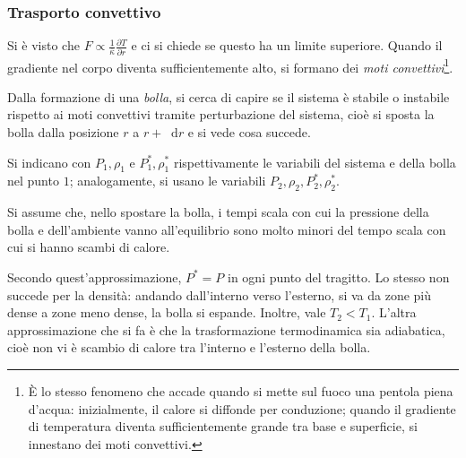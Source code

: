 \documentclass[11pt, a4paper]{scrartcl}
\theoremstyle{style}
\theoremstyle{style1}
\newcommand{\dd}{\mathop{}\!\mathrm{d}}
\numberwithin{equation}{subsection}
\begin{document}
\subsubsection{Trasporto convettivo}
Si \`e visto che $F \propto \frac{1}{\overline{\kappa }} \frac{\partial T}{\partial r} $ e ci si chiede se questo ha un limite superiore.
Quando il gradiente nel corpo diventa sufficientemente alto, si formano dei \textit{moti convettivi}\footnote{\`E lo stesso fenomeno che accade quando si mette sul fuoco una pentola piena d'acqua: inizialmente, il calore si diffonde per conduzione; quando il gradiente di temperatura diventa sufficientemente grande tra base e superficie, si innestano dei moti convettivi.}.

\begin{center}
	\begin{minipage}
		{.55\columnwidth}
	Dalla formazione di una \textit{bolla}, si cerca di capire se il sistema \`e stabile o instabile rispetto ai moti convettivi tramite perturbazione del sistema, cio\`e si sposta la bolla dalla posizione $r$ a $r+\dd r$ e si vede cosa succede.

	Si indicano con $P_1,\rho _1$ e $P_1^*, \rho _1^*$ rispettivamente le variabili del sistema e della bolla nel punto $1$; analogamente, si usano le variabili $P_2,\rho _2, P_2^*, \rho _2^*$.

	Si assume che, nello spostare la bolla, i tempi scala con cui la pressione della bolla e dell'ambiente vanno all'equilibrio sono molto minori del tempo scala con cui si hanno scambi di calore.
	\end{minipage}
	\hfill
	\begin{minipage}
		{.35\columnwidth}
	\centering
	\end{minipage}
\end{center}
Secondo quest'approssimazione, $P^*= P$ in ogni punto del tragitto.
Lo stesso non succede per la densit\`a: andando dall'interno verso l'esterno, si va da zone pi\`u dense a zone meno dense, la bolla si espande.
Inoltre, vale $T_2<T_1$.
L'altra approssimazione che si fa \`e che la trasformazione termodinamica sia adiabatica, cio\`e non vi \`e scambio di calore tra l'interno e l'esterno della bolla.
\end{document}
